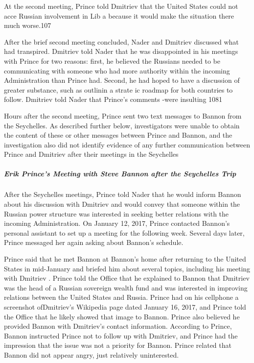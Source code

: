 At the second meeting, Prince told Dmitriev that the United States could not acce Russian involvement in Lib a because it would make the situation there much worse.107

After the brief second meeting concluded, Nader and Dmitriev discussed what had transpired.%
Dmitriev told Nader that he was disappointed in his meetings with Prince for two reasons: first, he believed the Russians needed to be communicating with someone who had more authority within the incoming Administration than Prince had.%
Second, he had hoped to have a discussion of greater substance, such as outlinin a strate ic roadmap for both countries to follow.%
Dmitriev told Nader that Prince's comments -were insulting 1081

Hours after the second meeting, Prince sent two text messages to Bannon from the Seychelles.%
As described further below, investigators were unable to obtain the content of these or other messages between Prince and Bannon, and the investigation also did not identify evidence of any further communication between Prince and Dmitriev after their meetings in the Seychelles

\subparagraph{Erik Prince's Meeting with Steve Bannon after the Seychelles Trip}

After the Seychelles meetings, Prince told Nader that he would inform Bannon about his discussion with Dmitriev and would convey that someone within the Russian power structure was interested in seeking better relations with the incoming Administration.%
On January 12, 2017, Prince contacted Bannon's personal assistant to set up a meeting for the following week.%
Several days later, Prince messaged her again asking about Bannon's schedule.%

Prince said that he met Bannon at Bannon's home after returning to the United States in mid-January and briefed him about several topics, including his meeting with Dmitriev .%
Prince told the Office that he explained to Bannon that Dmitriev was the head of a Russian sovereign wealth fund and was interested in improving relations between the United States and Russia.%
Prince had on his cellphone a screenshot ofDmitriev's Wikipedia page dated January 16, 2017, and Prince told the Office that he likely showed that image to Bannon.%
Prince also believed he provided Bannon with Dmitriev's contact information.%
According to Prince, Bannon instructed Prince not to follow up with Dmitriev, and Prince had the impression that the issue was not a priority for Bannon.%
Prince related that Bannon did not appear angry, just relatively uninterested.%

